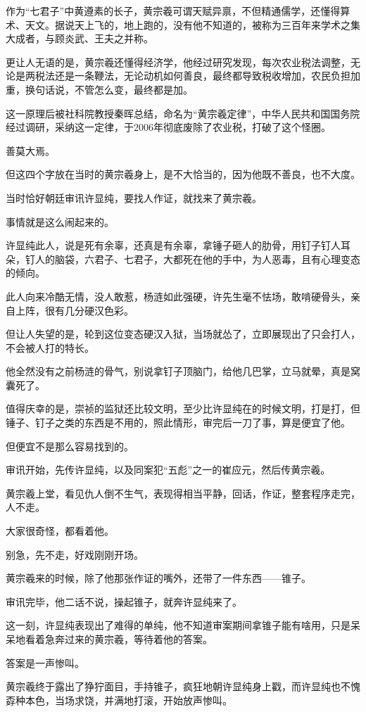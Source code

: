 \begin{multicols}{\theparacolNo}
作为“七君子”中黄遵素的长子，黄宗羲可谓天赋异禀，不但精通儒学，还懂得算术、天文。据说天上飞的，地上跑的，没有他不知道的，被称为三百年来学术之集大成者，与顾炎武、王夫之并称。

更让人无语的是，黄宗羲还懂得经济学，他经过研究发现，每次农业税法调整，无论是两税法还是一条鞭法，无论动机如何善良，最终都导致税收增加，农民负担加重，换句话说，不管怎么变，最终都是加。

这一原理后被社科院教授秦晖总结，命名为“黄宗羲定律”，中华人民共和国国务院经过调研，采纳这一定律，于2006年彻底废除了农业税，打破了这个怪圈。

善莫大焉。

但这四个字放在当时的黄宗羲身上，是不大恰当的，因为他既不善良，也不大度。

当时恰好朝廷审讯许显纯，要找人作证，就找来了黄宗羲。

事情就是这么闹起来的。

许显纯此人，说是死有余辜，还真是有余辜，拿锤子砸人的肋骨，用钉子钉人耳朵，钉人的脑袋，六君子、七君子，大都死在他的手中，为人恶毒，且有心理变态的倾向。

此人向来冷酷无情，没人敢惹，杨涟如此强硬，许先生毫不怯场，敢啃硬骨头，亲自上阵，很有几分硬汉色彩。

但让人失望的是，轮到这位变态硬汉入狱，当场就怂了，立即展现出了只会打人，不会被人打的特长。

他全然没有之前杨涟的骨气，别说拿钉子顶脑门，给他几巴掌，立马就晕，真是窝囊死了。

值得庆幸的是，崇祯的监狱还比较文明，至少比许显纯在的时候文明，打是打，但锤子、钉子之类的东西是不用的，照此情形，审完后一刀了事，算是便宜了他。

但便宜不是那么容易找到的。

审讯开始，先传许显纯，以及同案犯“五彪”之一的崔应元，然后传黄宗羲。

黄宗羲上堂，看见仇人倒不生气，表现得相当平静，回话，作证，整套程序走完，人不走。

大家很奇怪，都看着他。

别急，先不走，好戏刚刚开场。

黄宗羲来的时候，除了他那张作证的嘴外，还带了一件东西——锥子。

审讯完毕，他二话不说，操起锥子，就奔许显纯来了。

这一刻，许显纯表现出了难得的单纯，他不知道审案期间拿锥子能有啥用，只是呆呆地看着急奔过来的黄宗羲，等待着他的答案。

答案是一声惨叫。

黄宗羲终于露出了狰狞面目，手持锥子，疯狂地朝许显纯身上戳，而许显纯也不愧孬种本色，当场求饶，并满地打滚，开始放声惨叫。


\end{multicols}
